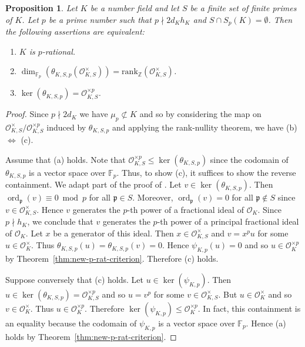 \documentclass[12pt, a4paper, usenames]{amsart}
\def\ord{\mathop{\mathrm {ord}}\nolimits}
\newcommand{\Z}{\mathbb{Z}}
\newcommand{\F}{\mathbb{F}}
\theoremstyle{plain}
\newtheorem{prop}[theorem]{Proposition}
\theoremstyle{remark}
\theoremstyle{definition}
\newcommand{\rank}{\mathrm{rank}}
\begin{document}
\begin{prop}\label{prop:p-rat-criterion-S-units} 
Let $K$ be a number field and let $S$ be a finite set of finite primes of $K$.
Let $p$ be a prime number such that $p \nmid 2d_{K}h_{K}$ and $S \cap S_{p}(K)=\emptyset$.
Then the following assertions are equivalent:
\begin{enumerate}
\item $K$ is $p$-rational.
\item $\dim_{\mathbb{F}_{p}}(\theta_{K,S,p}(\mathcal{O}_{K,S}^{\times})) = \rank_{\Z}(\mathcal{O}_{K,S}^{\times})$.
\item $\ker(\theta_{K,S,p}) = \mathcal{O}_{K,S}^{\times p}$.
\end{enumerate}    
\end{prop}

\begin{proof}
Since $p \nmid 2d_{K}$ we have $\mu_{p} \not \subset K$ and so 
by considering the map on $\mathcal{O}_{K,S}^{\times}/\mathcal{O}_{K,S}^{\times p}$
induced by $\theta_{K,S,p}$ and applying the rank-nullity theorem, we have 
(b) $\Longleftrightarrow$ (c).

Assume that (a) holds. Note that $\mathcal{O}_{K,S}^{\times p} \leq \ker(\theta_{K,S,p})$
since the codomain of $\theta_{K,S,p}$ is a vector space over $\F_{p}$.
Thus, to show (c), it suffices to show the reverse 
containment.
We adapt part of the proof of \cite[Proposition~3.8]{MR1253502}.
Let $v \in \ker(\theta_{K,S,p})$. 
Then $\ord_{\mathfrak{p}}(v) \equiv 0 \bmod{p}$ for all $\mathfrak{p} \in S$.
Moreover,  
$\ord_{\mathfrak{p}}(v) = 0$ for all $\mathfrak{p} \notin S$ since $v \in \mathcal{O}_{K,S}^{\times}$.
Hence $v$ generates the $p$-th power of a fractional ideal of $\mathcal{O}_{K}$.
Since $p \nmid h_{K}$, we conclude that $v$ generates the $p$-th power of a principal fractional ideal 
of $\mathcal{O}_{K}$. Let $x$ be a generator of this ideal. 
Then $x \in \mathcal{O}_{K,S}^{\times}$ and $v = x^{p} u$ for some $u \in \mathcal{O}_{K}^{\times}$.
Thus $\theta_{K,S,p}(u) = \theta_{K,S,p}(v)=0$. 
Hence $\psi_{K,p}(u)=0$ and so $u \in \mathcal{O}_{K}^{\times p}$ by 
Theorem~\ref{thm:new-p-rat-criterion}.
Therefore (c) holds. 

Suppose conversely that (c) holds. Let $u \in \ker(\psi_{K,p})$.
Then $u \in \ker(\theta_{K,S,p})=\mathcal{O}_{K,S}^{\times p}$ and so
$u=v^{p}$ for some $v \in \mathcal{O}_{K,S}^{\times}$. 
But $u \in \mathcal{O}_{K}^{\times}$ and so $v \in \mathcal{O}_{K}^{\times}$.
Thus $u \in \mathcal{O}_{K}^{\times p}$. 
Therefore $\ker(\psi_{K,p}) \leq \mathcal{O}_{K}^{\times p}$.
In fact, this containment is an equality because the codomain
of $\psi_{K,p}$ is a vector space over $\F_{p}$.
Hence (a) holds by Theorem~\ref{thm:new-p-rat-criterion}.
\end{proof}
\end{document}
